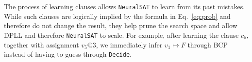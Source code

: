 \documentclass[oneside,11pt,dvipsnames]{book}
\numberwithin{equation}{section}
\theoremstyle{definition}
\theoremstyle{remark}
\newcommand{\tool}{\texttt{NeuralSAT}}
\begin{document}
The process of learning clauses allows \tool{} to learn from its past mistakes.
While such clauses are logically implied by the formula in Eq.~\ref{eq:prob} and therefore do not change the result, they help prune the search space and allow DPLL and therefore \tool{} to scale. For example, after learning the clause $c_5$, together with assignment $v_5@3$, we immediately infer $v_1 \mapsto F$ through BCP instead of having to guess through \texttt{Decide}.







\end{document}
